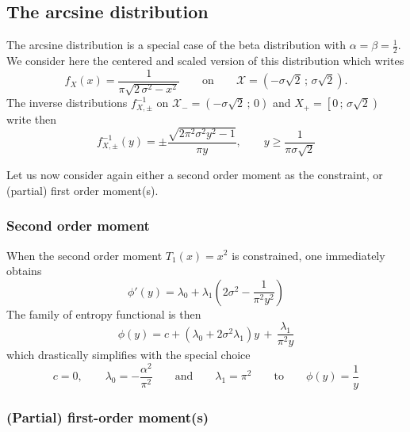 \documentclass[english,sort&compress]{elsarticle}
\theoremstyle{definition}
\theoremstyle{plain}
\theoremstyle{plain}
\def\X{\mathcal{X}}
\begin{document}

\subsection{The arcsine distribution}
\label{subsec:Arcsine}

The arcsine distribution is a special case of the beta distribution with $\alpha
= \beta  = \frac12$. We  consider here the  centered and scaled version  of this
distribution which writes
%
\[
f_X(x) = \frac{1}{\pi\sqrt{ 2 \, \sigma^2 - x^2}} \qquad \mbox{on} \qquad \X = \left(
- \sigma \sqrt2 \, ; \, \sigma \sqrt2 \right).
\]
%
The inverse distributions $f_{X,\pm}^{-1}$ on $\X_-  = \left( - \sigma \sqrt2 \,
; \, 0 \right)$ and $X_+ = \left[ 0 \, ; \, \sigma \sqrt2 \right)$ write then
%
\[
f_{X,\pm}^{-1}(y) = \pm \frac{\sqrt{2 \pi^2  \sigma^2 y^2 - 1}}{\pi y}, \qquad y
\ge \frac{1}{\pi \sigma \sqrt2}
\]


Let us  now consider again  either a second  order moment as the  constraint, or
(partial) first order moment(s).



\subsubsection{Second order moment}

When  the second order  moment $T_1(x)  = x^2$  is constrained,  one immediately
obtains
%
\[
\phi'(y)=\lambda_0 + \lambda_1\left(2\sigma^{2}-\frac{1}{\pi^{2}y^{2}}\right)
\]
%
The family of entropy functional is then 
%
\[
\phi(y)  = c  +  \left( \lambda_0  +  2 \sigma^2  \lambda_1 \right)  y  \, +  \,
\frac{\lambda_1}{\pi^2 y}
\]
%
which    drastically   simplifies    with    the   special choice
%
\[
c  = 0,  \qquad \lambda_0  = -  \frac{\alpha^2}{\pi^2} \qquad  \mbox{and} \qquad
\lambda_1 = \pi^2 \qquad \mbox{to} \qquad\phi(y) = \frac{1}{y}
\]
%



\subsubsection{(Partial) first-order moment(s)}
\end{document}

